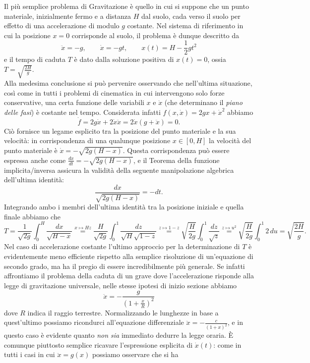 \documentclass[a4paper,twoside]{article}
\theoremstyle{definition}
\numberwithin{theorem}{section}
\begin{document}
Il più semplice problema di Gravitazione è quello in cui si suppone che un punto materiale, inizialmente fermo e a distanza $H$ dal suolo, cada verso il suolo per effetto di una accelerazione di modulo $g$ costante. Nel sistema di riferimento in cui la posizione $x=0$ corrisponde al suolo, il problema è dunque descritto da 
$$ \ddot{x}=-g,\qquad \dot x = -gt,\qquad x(t) = H-\frac{1}{2}gt^2 $$
e il tempo di caduta $T$ è dato dalla soluzione positiva di $x(t)=0$, ossia $T=\sqrt{\frac{2H}{g}}$.\\
Alla medesima conclusione si può pervenire osservando che nell'ultima situazione, così come in tutti i problemi di cinematica in cui intervengono solo forze conservative, una certa funzione delle variabili $x$ e $\dot{x}$ (che determinano il \emph{piano delle fasi}) è costante nel tempo. Considerata infatti $f(x,\dot{x})=2g x+\dot{x}^2$ abbiamo 
$$ \dot{f} = 2g\dot{x} + 2\dot{x}\ddot{x} = 2\dot{x}(g+\ddot{x}) = 0. $$
Ciò fornisce un legame esplicito tra la posizione del punto materiale e la sua velocità: in corrispondenza di una qualunque posizione $x\in[0,H]$ la velocità del punto materiale è $\dot{x}=-\sqrt{2g(H-x)}$. Questa corrispondenza può essere espressa anche come $\frac{dx}{dt}=-\sqrt{2g(H-x)}$, e il Teorema della funzione implicita/inversa assicura la validità della seguente manipolazione algebrica dell'ultima identità:
$$ \frac{dx}{\sqrt{2g(H-x)}} = -dt. $$
Integrando ambo i membri dell'ultima identità tra la posizione iniziale e quella finale abbiamo che 
$$ T = \frac{1}{\sqrt{2g}}\int_{0}^{H}\frac{dx}{\sqrt{H-x}}\stackrel{x\mapsto Hz}{=}\frac{H}{\sqrt{2g}}\int_{0}^{1}\frac{dz}{\sqrt{H}\sqrt{1-z}}\stackrel{z\mapsto 1-z}{=}\sqrt{\frac{H}{2g}}\int_{0}^{1}\frac{dz}{\sqrt{z}}\stackrel{z\mapsto u^2}{=}\sqrt{\frac{H}{2g}}\int_{0}^{1}2\,du = \sqrt{\frac{2H}{g}}. $$
Nel caso di accelerazione costante l'ultimo approccio per la determinazione di $T$ è evidentemente meno efficiente rispetto alla semplice risoluzione di un'equazione di secondo grado, ma ha il pregio di essere incredibilmente più generale. Se infatti affrontiamo il problema della caduta di un grave dove l'accelerazione risponde alla legge di gravitazione universale, nelle stesse ipotesi di inizio sezione abbiamo 
$$ \ddot{x} = -\frac{g}{\left(1+\frac{x}{R}\right)^2} $$
dove $R$ indica il raggio terrestre. Normalizzando le lunghezze in base a quest'ultimo possiamo ricondurci all'equazione differenziale $\ddot{x} = -\frac{c}{(1+x)^2}$, e in questo caso è evidente quanto \emph{non sia} immediato dedurre la legge oraria. È comunque piuttosto semplice ricavare l'espressione esplicita di $\dot{x}(t)$: come in tutti i casi in cui $\ddot{x}=g(x)$ possiamo osservare che si ha
\end{document}
